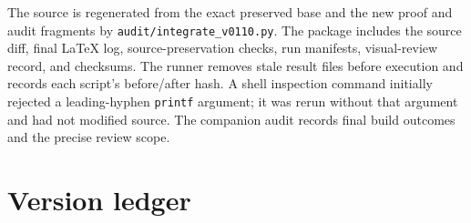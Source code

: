 \documentclass[11pt]{article}
\theoremstyle{definition}
\theoremstyle{remark}
\begin{document}
The source is regenerated from the exact preserved base and the new proof and audit fragments by \texttt{audit/integrate\_v0110.py}. The package includes the source diff, final LaTeX log, source-preservation checks, run manifests, visual-review record, and checksums. The runner removes stale result files before execution and records each script's before/after hash. A shell inspection command initially rejected a leading-hyphen \texttt{printf} argument; it was rerun without that argument and had not modified source. The companion audit records final build outcomes and the precise review scope.


\clearpage
\section{Version ledger}
\end{document}
